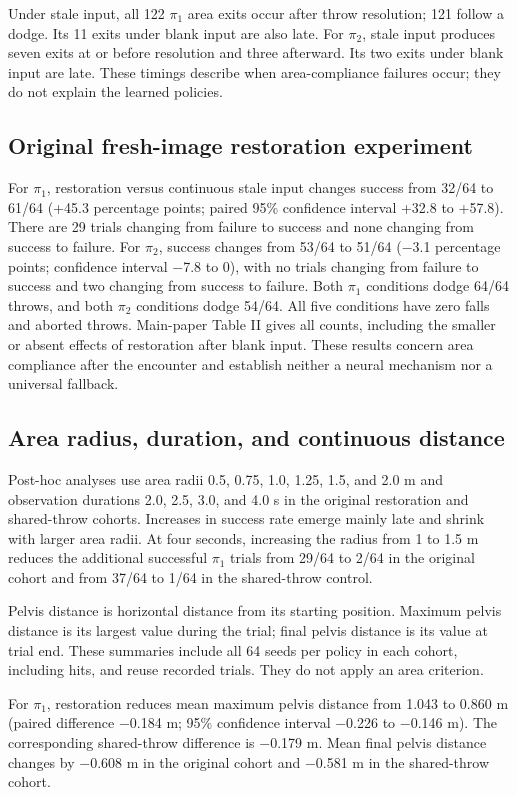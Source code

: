 Under stale input, all 122 $\pi_1$ area exits occur after throw resolution;
121 follow a dodge. Its 11 exits under blank input are also late. For $\pi_2$,
stale input produces seven exits at or before resolution and three afterward.
Its two exits under blank input are late. These timings describe when
area-compliance failures occur; they do not explain the learned policies.

\subsection{Original fresh-image restoration experiment}
For $\pi_1$, restoration versus continuous stale input changes success from
32/64 to 61/64 (+45.3 percentage points; paired 95\% confidence interval
+32.8 to +57.8). There are 29 trials changing from failure to success and none
changing from success to failure. For $\pi_2$, success changes from 53/64 to
51/64 ($-$3.1 percentage points; confidence interval $-$7.8 to 0), with no
trials changing from failure to success and two changing from success to
failure. Both $\pi_1$ conditions dodge 64/64 throws, and both $\pi_2$ conditions
dodge 54/64. All five conditions have zero falls and aborted throws.
Main-paper Table II gives all counts, including the smaller or absent effects
of restoration after blank input. These results concern area compliance after
the encounter and establish neither a neural mechanism nor a universal fallback.

\subsection{Area radius, duration, and continuous distance}
Post-hoc analyses use area radii 0.5, 0.75, 1.0, 1.25, 1.5, and 2.0 m and
observation durations 2.0, 2.5, 3.0, and 4.0 s in the original restoration and
shared-throw cohorts. Increases in success rate emerge mainly late and shrink
with larger area radii. At four seconds, increasing the radius from 1 to 1.5 m
reduces the additional successful $\pi_1$ trials from 29/64 to 2/64 in the
original cohort and from 37/64 to 1/64 in the shared-throw control.

Pelvis distance is horizontal distance from its starting position. Maximum
pelvis distance is its largest value during the trial; final pelvis distance
is its value at trial end. These summaries include all 64 seeds per policy in
each cohort, including hits, and reuse recorded trials. They do not apply an
area criterion.

For $\pi_1$, restoration reduces mean maximum pelvis distance from 1.043 to
0.860 m (paired difference $-$0.184 m; 95\% confidence interval $-$0.226 to
$-$0.146 m). The corresponding shared-throw difference is $-$0.179 m.
Mean final pelvis distance changes by $-$0.608 m in the original cohort and
$-$0.581 m in the shared-throw cohort.

